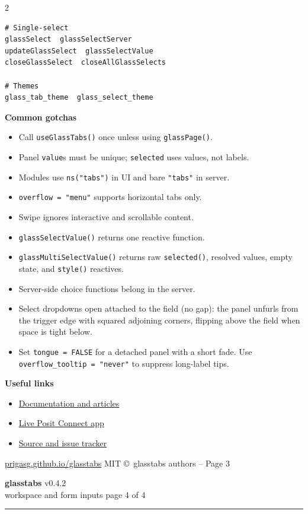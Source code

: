 \documentclass[9pt,a4paper]{article}
\newcommand{\code}[1]{\texttt{\footnotesize\color{codefg}#1}}
\newcommand{\gtfn}[1]{\texttt{\footnotesize\color{codekw}#1()}}
\newcommand{\gtarg}[1]{\texttt{\footnotesize\color{gtgreen}#1}}
\newcommand{\mysection}[1]{%
  \vspace{3pt}%
  \noindent\colorbox{sectionbg}{%
    \parbox{\dimexpr\linewidth-2\fboxsep\relax}{%
      \strut\textbf{\small\color{white}#1}\strut%
    }%
  }%
  \vspace{2pt}\par%
}
\newcommand{\sheetheader}[2]{%
  {\large\bfseries\color{gtblue}glasstabs}%
  \hfill{\tiny\color{gtgray}v0.4.2}\\[1pt]
  {\footnotesize\color{gtgray}#1}%
  \hfill{\tiny\color{gtgray}#2}\\[-3pt]
  \rule{\linewidth}{0.6pt}
}
\begin{document}
\begin{multicols*}{2}
\begin{lstlisting}
# Single-select
glassSelect  glassSelectServer
updateGlassSelect  glassSelectValue
closeGlassSelect  closeAllGlassSelects

# Themes
glass_tab_theme  glass_select_theme
\end{lstlisting}

\columnbreak
\mysection{Common gotchas}

\begin{itemize}
  \item Call \gtfn{useGlassTabs} once unless using \gtfn{glassPage}.
  \item Panel \gtarg{value}s must be unique; \gtarg{selected} uses values, not labels.
  \item Modules use \code{ns("tabs")} in UI and bare \code{"tabs"} in server.
  \item \gtarg{overflow = "menu"} supports horizontal tabs only.
  \item Swipe ignores interactive and scrollable content.
  \item \gtfn{glassSelectValue} returns one reactive function.
  \item \gtfn{glassMultiSelectValue} returns raw \code{selected()}, resolved
        values, empty state, and \code{style()} reactives.
  \item Server-side choice functions belong in the server.
  \item Select dropdowns open attached to the field (no gap): the panel
        unfurls from the trigger edge with squared adjoining corners,
        flipping above the field when space is tight below.
  \item Set \gtarg{tongue = FALSE} for a detached panel with a short fade.
        Use \gtarg{overflow\_tooltip = "never"} to suppress long-label tips.
\end{itemize}

\mysection{Useful links}

\begin{itemize}
  \item \href{https://prigasg.github.io/glasstabs/}{Documentation and articles}
  \item \href{https://prigas89-glasstabs.share.connect.posit.cloud}{Live Posit Connect app}
  \item \href{https://github.com/PrigasG/glasstabs}{Source and issue tracker}
\end{itemize}

\vfill
{\tiny\color{gtgray}
\href{https://prigasg.github.io/glasstabs/}{prigasg.github.io/glasstabs}
\hfill MIT \copyright\ glasstabs authors -- Page 3}
\end{multicols*}
\newpage
\sheetheader{workspace and form inputs}{page 4 of 4}
\end{document}
